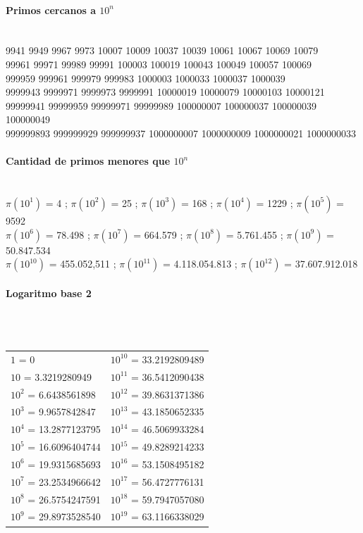 \paragraph{Primos cercanos a $10^n$}\ \\
9941 9949 9967 9973 10007 10009 10037 10039 10061 10067 10069 10079\\
99961 99971 99989 99991 100003 100019 100043 100049 100057 100069\\
999959 999961 999979 999983 1000003 1000033 1000037 1000039\\
9999943 9999971 9999973 9999991 10000019 10000079 10000103 10000121\\
99999941 99999959 99999971 99999989 100000007 100000037 100000039 100000049\\
999999893 999999929 999999937 1000000007 1000000009 1000000021 1000000033

\paragraph{Cantidad de primos menores que $10^n$}\ \\
$\pi(10^1)$ = 4 ;
$\pi(10^2)$ = 25 ;
$\pi(10^3)$ = 168 ;
$\pi(10^4)$ = 1229 ;
$\pi(10^5)$ = 9592 \\
$\pi(10^6)$ = 78.498 ;
$\pi(10^7)$ = 664.579 ;
$\pi(10^8)$ = 5.761.455 ;
$\pi(10^9)$ = 50.847.534 \\
$\pi(10^{10})$ = 455.052,511 ;
$\pi(10^{11})$ = 4.118.054.813 ;
$\pi(10^{12})$ = 37.607.912.018%
%
%
%

\paragraph{Logaritmo base 2} \ \\\
\begin{tabular}{l|l}
$1$ =  0        & $10^{10}$ = 33.2192809489 \\
$10$ =  3.3219280949         & $10^{11}$ = 36.5412090438 \\
$10^{2}$ =  6.6438561898         & $10^{12}$ = 39.8631371386 \\
$10^{3}$ =  9.9657842847         & $10^{13}$ = 43.1850652335 \\
$10^{4}$ =  13.2877123795         & $10^{14}$ = 46.5069933284 \\
$10^{5}$ =  16.6096404744         & $10^{15}$ = 49.8289214233 \\
$10^{6}$ =  19.9315685693         & $10^{16}$ = 53.1508495182 \\
$10^{7}$ =  23.2534966642         & $10^{17}$ = 56.4727776131 \\
$10^{8}$ =  26.5754247591         & $10^{18}$ = 59.7947057080 \\
$10^{9}$ =  29.8973528540         & $10^{19}$ = 63.1166338029 \\
\end{tabular}

